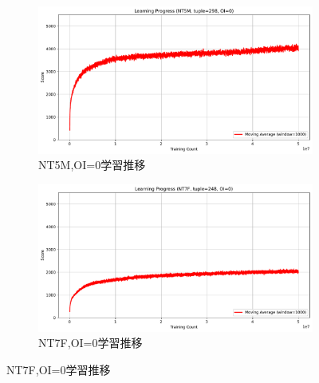 \begin{figure}[t]
    \centering
    \begin{subfigure}[b]{0.49\linewidth}
        \includegraphics[width=\linewidth]{pdf/learning_progress_plots/learning_progress_NT5_tuple298_OI0.pdf}
        \caption{NT5M,OI=0学習推移}
        \label{fig:NT5F_OI0_learning_progress}
    \end{subfigure}
    \begin{subfigure}[b]{0.49\linewidth}
        \includegraphics[width=\linewidth]{pdf/learning_progress_plots/learning_progress_NT7_tuple248_OI0.pdf}
        \caption{NT7F,OI=0学習推移}
        \label{fig:NT7F_OI0_learning_progress}
    \end{subfigure}


\end{figure}
